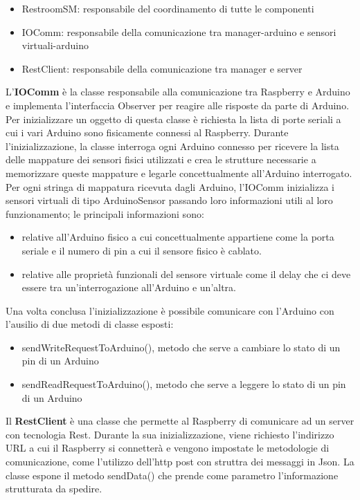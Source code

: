 \documentclass[12pt]{article}
\begin{document}
\begin{itemize}
\item RestroomSM: responsabile del coordinamento di tutte le componenti
\item IOComm: responsabile della comunicazione tra manager-arduino e sensori virtuali-arduino
\item RestClient: responsabile della comunicazione tra manager e server
\end{itemize}
L'\textbf{IOComm} è la classe responsabile alla comunicazione tra Raspberry e Arduino e implementa l'interfaccia Observer per reagire alle risposte da parte di Arduino. Per inizializzare un oggetto di questa classe è richiesta la lista di porte seriali a cui i vari Arduino sono fisicamente connessi al Raspberry. 
Durante l'inizializzazione, la classe interroga ogni Arduino connesso per ricevere la lista delle mappature dei sensori fisici utilizzati e crea le strutture necessarie a memorizzare queste mappature e legarle concettualmente all'Arduino interrogato. Per ogni stringa di mappatura ricevuta dagli Arduino, l'IOComm inizializza i sensori virtuali di tipo ArduinoSensor passando loro informazioni utili al loro funzionamento; le principali informazioni sono:
\begin{itemize}
\item relative all'Arduino fisico a cui concettualmente appartiene come la porta seriale e il numero di pin a cui il sensore fisico è cablato.
\item relative alle proprietà funzionali del sensore virtuale come il delay che ci deve essere tra un'interrogazione all'Arduino e un'altra.
\end{itemize}
Una volta conclusa l'inizializzazione è possibile comunicare con l'Arduino con l'ausilio di due metodi di classe esposti:
\begin{itemize}
\item sendWriteRequestToArduino(), metodo che serve a cambiare lo stato di un pin di un Arduino
\item sendReadRequestToArduino(), metodo che serve a leggere lo stato di un pin di un Arduino
\end{itemize}
Il \textbf{RestClient} è una classe che permette al Raspberry di comunicare ad un server con tecnologia Rest. Durante la sua inizializzazione, viene richiesto l'indirizzo URL a cui il Raspberry si connetterà e vengono impostate le metodologie di comunicazione, come l'utilizzo dell'http post con struttra dei messaggi in Json.
La classe espone il metodo sendData() che prende come parametro l'informazione strutturata da spedire.
\end{document}
